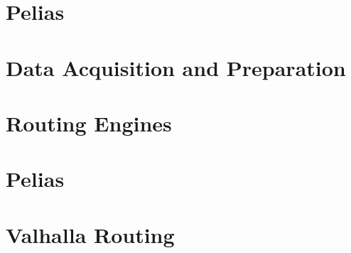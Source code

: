 \documentclass[12pt]{report}
\renewcommand{\listfigurename}{\begingroup
    \tocchapter{}
    \tocfile{\listoffigurename}{B Illustration Directory}
\endgroup}
\begin{document}
\chapter{Pelias}


\chapter{Data Acquisition and Preparation}

\chapter{Routing Engines}



\newpage


\renewcommand{\listfigurename}{B Illustration Directory}
\listoffigures
\listoftables

\begin{appendices}
  \chapter{Pelias}
  
  \chapter{Valhalla Routing}
  
\end{appendices}
\end{document}
